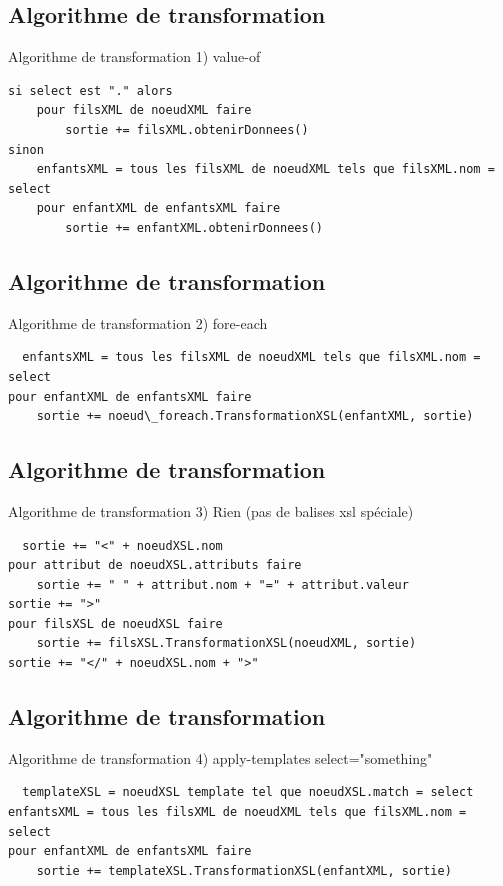 \documentclass[aspectratio=169]{beamer}
\begin{document}
\subsection{Algorithme de transformation}
\begin{frame}[fragile]{Algorithme de transformation}
1) value-of
\scriptsize
\begin{verbatim}
si select est "." alors
    pour filsXML de noeudXML faire
        sortie += filsXML.obtenirDonnees()
sinon
    enfantsXML = tous les filsXML de noeudXML tels que filsXML.nom = select
    pour enfantXML de enfantsXML faire
        sortie += enfantXML.obtenirDonnees()
\end{verbatim}
\normalsize
\end{frame}

\subsection{Algorithme de transformation}
\begin{frame}[fragile]{Algorithme de transformation}
 2) fore-each
 \scriptsize
 \begin{verbatim}
  enfantsXML = tous les filsXML de noeudXML tels que filsXML.nom = select
pour enfantXML de enfantsXML faire
    sortie += noeud\_foreach.TransformationXSL(enfantXML, sortie)
 \end{verbatim}
\normalsize
\end{frame}

\subsection{Algorithme de transformation}
\begin{frame}[fragile]{Algorithme de transformation}
 3) Rien (pas de balises xsl spéciale)
 \scriptsize
 \begin{verbatim}
  sortie += "<" + noeudXSL.nom
pour attribut de noeudXSL.attributs faire
    sortie += " " + attribut.nom + "=" + attribut.valeur
sortie += ">"
pour filsXSL de noeudXSL faire
    sortie += filsXSL.TransformationXSL(noeudXML, sortie)    
sortie += "</" + noeudXSL.nom + ">"
 \end{verbatim}
\normalsize
\end{frame}

\subsection{Algorithme de transformation}
\begin{frame}[fragile]{Algorithme de transformation}
 4) apply-templates select="something"
 \scriptsize
 \begin{verbatim}
  templateXSL = noeudXSL template tel que noeudXSL.match = select
enfantsXML = tous les filsXML de noeudXML tels que filsXML.nom = select
pour enfantXML de enfantsXML faire
    sortie += templateXSL.TransformationXSL(enfantXML, sortie)
 \end{verbatim}
\normalsize
\end{frame}
\end{document}
